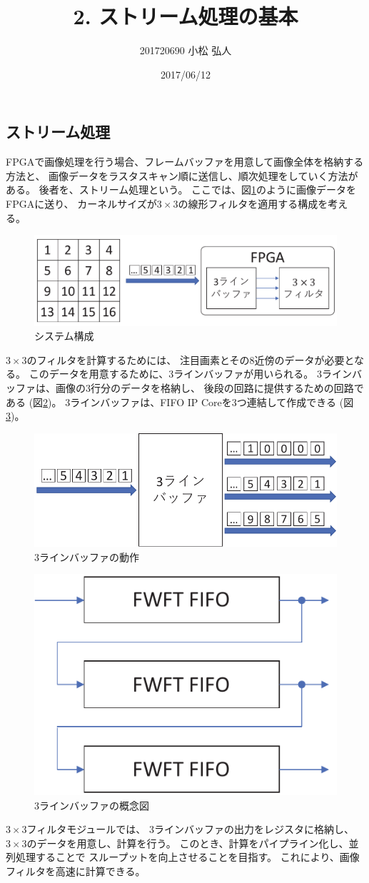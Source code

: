 \documentclass[11pt]{jsarticle}
\title{2. ストリーム処理の基本}
\author{201720690 小松 弘人}
\date{2017/06/12}
\begin{document}
\maketitle
\subsection*{ストリーム処理}
FPGAで画像処理を行う場合、フレームバッファを用意して画像全体を格納する方法と、
画像データをラスタスキャン順に送信し、順次処理をしていく方法がある。
後者を、ストリーム処理という。
ここでは、図\ref{img:raster}のように画像データをFPGAに送り、
カーネルサイズが$3\!\times\!3$の線形フィルタを適用する構成を考える。

\begin{figure}[ht]
	\centering
	\includegraphics[width=0.7\linewidth]{img/raster.pdf}
	\caption{システム構成}
	\label{img:raster}
\end{figure}

\vspace{-0.5cm}

$3\!\times\!3$のフィルタを計算するためには、
注目画素とその8近傍のデータが必要となる。
このデータを用意するために、3ラインバッファが用いられる。
3ラインバッファは、画像の3行分のデータを格納し、
後段の回路に提供するための回路である (図\ref{img:3linebuf})。
3ラインバッファは、FIFO IP Coreを3つ連結して作成できる (図\ref{img:3lb_fifo})。

\begin{figure}[ht]
	\centering
	\includegraphics[width=0.5\linewidth]{img/3lb.pdf}
	\caption{3ラインバッファの動作}
	\label{img:3linebuf}
\end{figure}

\vspace{-0.5cm}

\begin{figure}[ht]
	\centering
	\includegraphics[width=0.3\linewidth]{img/3lb_fifo.pdf}
	\caption{3ラインバッファの概念図}
	\label{img:3lb_fifo}
\end{figure}

$3\!\times\!3$フィルタモジュールでは、
3ラインバッファの出力をレジスタに格納し、
$3\!\times\!3$のデータを用意し、計算を行う。
このとき、計算をパイプライン化し、並列処理することで
スループットを向上させることを目指す。
これにより、画像フィルタを高速に計算できる。
\end{document}
